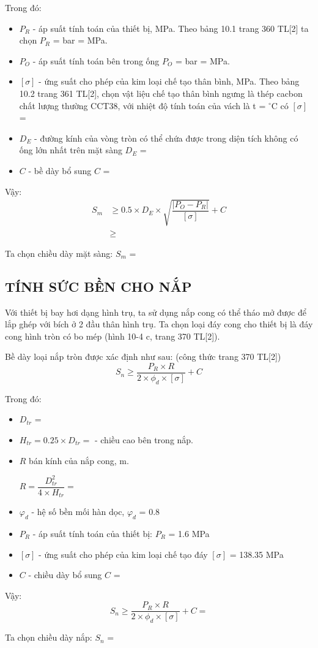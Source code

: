 Trong đó:
\begin{itemize}
	\item $P_{R}$ - áp suất tính toán của thiết bị, MPa. Theo bảng 10.1 trang 360 TL[2] ta chọn $P_{R}$ =  bar =  MPa.
	\item $P_{O}$ - áp suất tính toán bên trong ống $P_{O}$ =  bar =  MPa.
	\item $[\sigma]$ - ứng suất cho phép của kim loại chế tạo thân bình, MPa. Theo bảng 10.2 trang 361 TL[2], chọn vật liệu chế tạo thân bình ngưng là thép cacbon chất lượng thường CCT38, với nhiệt độ tính toán của vách là t = $^{\circ}$C có $[\sigma]$ = 	
	\item $D_{E}$ - đường kính của vòng tròn có thể chứa được trong diện tích không có ống lớn nhất trên mặt sàng $D_{E}$ = 
	\item $C$ - bề dày bổ sung $C$ = 
\end{itemize}

Vậy:
\begin{equation*}
	\begin{split}
		S_{m} &\geq 0.5\times D_{E}\times \sqrt{\dfrac{|P_{O} - P_{R}|}{[\sigma]}} + C\\
		&\geq 
	\end{split}
\end{equation*}

Ta chọn chiều dày mặt sàng: $S_{m}$ = 

\subsection{TÍNH SỨC BỀN CHO NẮP}
Với thiết bị bay hơi dạng hình trụ, ta sử dụng nắp cong có thể tháo mở được để lắp ghép với bích ở 2 đầu thân hình trụ. Ta chọn loại đáy cong cho thiết bị là đáy cong hình tròn có bo mép (hình 10-4 c, trang 370 TL[2]).

Bề dày loại nắp tròn được xác định như sau: (công thức trang 370 TL[2])
\begin{equation*}
	S_{n} \geq \dfrac{P_{R}\times R}{2\times \phi_{d}\times[\sigma]} + C
\end{equation*}

Trong đó:
\begin{itemize}
	\item $D_{tr}$ = 
	\item $H_{tr} = 0.25\times D_{tr} = $ - chiều cao bên trong nắp.
	\item $R$ bán kính của nắp cong, m.
	
	$R = \dfrac{D_{tr}^2}{4\times H_{tr}} = $ 
	\item $ \varphi_{d} $ - hệ số bền mối hàn dọc, $\varphi_{d}$ = 0.8
	\item $P_{R}$ - áp suất tính toán của thiết bị: $P_{R}$ = 1.6 MPa
	\item $[\sigma]$ - ứng suất cho phép của kim loại chế tạo đáy $[\sigma]$ = 138.35 MPa 
	\item $C$ - chiều dày bổ sung $C$ = 
\end{itemize}

Vậy: 
\begin{equation*}
	S_{n} \geq \dfrac{P_{R}\times R}{2\times \phi_{d}\times[\sigma]} + C = 
\end{equation*}

Ta chọn chiều dày nắp: $S_{n}$ = 













